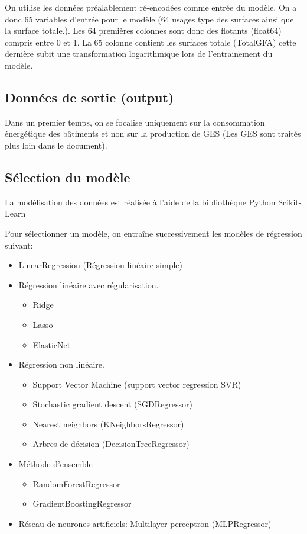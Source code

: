 On utilise les données préalablement ré-encodées comme entrée du modèle.
On a donc 65 variables d'entrée pour le modèle (64 usages type des surfaces ainsi
que la surface totale.).
Les 64 premières colonnes sont donc des flotants (float64) compris entre 0 et 1.
La 65 colonne contient les surfaces totale (TotalGFA) cette dernière
subit une transformation logarithmique lors de l'entrainement du modèle.

\subsection{Données de sortie (output)}

Dans un premier temps, on se focalise uniquement sur la consommation énergétique
des bâtiments et non sur la production de GES (Les GES sont traités plus loin
dans le document).

\subsection{Sélection du modèle}
La modélisation des données est réalisée à l'aide de la bibliothèque Python Scikit-Learn \cite{scikit-learn}

Pour sélectionner un modèle, on entraîne successivement les modèles de
régression suivant:
\begin{itemize}
  \item LinearRegression (Régression linéaire simple)
  \item Régression linéaire avec régularisation.
  \begin{itemize}
    \item Ridge \cite{Marquardt1975}
    \item Lasso \cite{tibshirani96regression}
    \item ElasticNet
  \end{itemize}
  \item Régression non linéaire.
  \begin{itemize}
    \item Support Vector Machine (support vector regression SVR)
    \item Stochastic gradient descent (SGDRegressor)
    \item Nearest neighbors (KNeighborsRegressor)
    \item Arbres de décision (DecisionTreeRegressor)
  \end{itemize}
  \item Méthode d'ensemble
  \begin{itemize}
    \item RandomForestRegressor
    \item GradientBoostingRegressor
  \end{itemize}
  \item Réseau de neurones artificiels: Multilayer perceptron (MLPRegressor)
\end{itemize}


